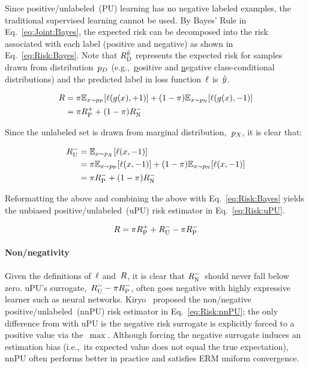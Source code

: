 Since positive\-/unlabeled~(PU) learning has no negative labeled examples, the traditional supervised learning cannot be used. By Bayes' Rule in Eq.~\eqref{eq:Joint:Bayes}, the expected risk can be decomposed into the risk associated with each label (positive and negative) as shown in Eq.~\eqref{eq:Risk:Bayes}.  Note that ${R_{\textnormal{D}}^{\hat{y}}}$ represents the expected risk for samples drawn from distribution~${p_{D}}$ (e.g.,~\underline{p}ositive and \underline{n}egative class-conditional distributions) and the predicted label in loss function~$\ell$ is~$\hat{y}$.

\begin{align}
  R &= \pi \mathbb{E}_{x \sim p_{\textnormal{P}}}\lbrack\ell\mathopen{}\left(g\mathopen{}\left(x\right)\mathclose{},{+}1\right)\mathclose{}\rbrack + (1-\pi) \mathbb{E}_{x \sim p_{\textnormal{N}}}\lbrack\ell\mathopen{}\left(g\mathopen{}\left(x\right)\mathclose{},{-}1\right)\mathclose{}\rbrack \nonumber \\
        &= \pi R_{\textnormal{P}}^{{+}} + (1-\pi) R_{\textnormal{N}}^{{-}} \label{eq:Risk:Bayes}
\end{align}

Since the unlabeled set is drawn from marginal distribution,~$p_{X}$, it is clear that:

\begin{align}
  R_{\textnormal{U}}^{{-}} &= \mathbb{E}_{x \sim p_{X}} \lbrack\ell\mathopen{}\left(x,{-}1\right)\mathclose{}\rbrack \nonumber \\
            &= \pi \mathbb{E}_{x \sim p_{\textnormal{P}}} \lbrack\ell\mathopen{}\left(x,{-}1\right)\mathclose{}\rbrack + (1 - \pi) \mathbb{E}_{x \sim p_{\textnormal{N}}} \lbrack\ell\mathopen{}\left(x,{-}1\right)\mathclose{}\rbrack\nonumber \\
            &= \pi R_{\textnormal{P}}^{{-}} + (1 - \pi) R_{\textnormal{N}}^{{-}} \label{eq:Risk:Unlabeled}
\end{align}

\noindent
Reformatting the above and combining the above with Eq.~\eqref{eq:Risk:Bayes} yields the unbiased positive\-/unlabeled~(uPU) risk estimator in Eq.~\eqref{eq:Risk:uPU}.~\cite{duPlessis:2014}

\begin{equation}\label{eq:Risk:uPU}
  R = \pi R_{\textnormal{P}}^{{+}} + R_{\textnormal{U}}^{{-}} - \pi R_{\textnormal{P}}^{{-}}
\end{equation}

\paragraph{Non\-/negativity} Given the definitions of~$\ell$ and~$R$, it is clear that $R_{\textnormal{N}}^{{-}}$~should never fall below zero.  uPU's surrogate,~${R_{\textnormal{U}}^{{-}} - \pi R_{\textnormal{P}}^{{-}}}$, often goes negative with highly expressive learner such as neural networks.  Kiryo\etal~\cite{Kiryo:2017} proposed the non\-/negative positive\-/unlabeled~(nnPU) risk estimator in Eq.~\eqref{eq:Risk:nnPU}; the only difference from with uPU is the negative risk surrogate is explicitly forced to a positive value via the~$\max$.  Although forcing the negative surrogate induces an estimation bias (i.e.,~its expected value does not equal the true expectation), nnPU often performs better in practice and satisfies ERM uniform convergence.

